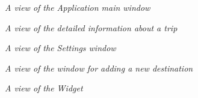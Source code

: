 




\begin{figure}
 
\begin{center}

  \caption{\emph{A view of the Application main window}}
  

\end{center}    
\end{figure}

\begin{figure}
 
\begin{center}

  \caption{\emph{A view of the detailed information about a trip}}
  

\end{center}    
\end{figure}


\begin{figure}
 
\begin{center}

  \caption{\emph{A view of the Settings window}}
  

\end{center}    
\end{figure}


\begin{figure}
 
\begin{center}

  \caption{\emph{A view of the window for adding a new destination}}
  

\end{center}    
\end{figure}


\begin{figure}
 
\begin{center}

  \caption{\emph{A view of the Widget}}
  

\end{center}    
\end{figure}





